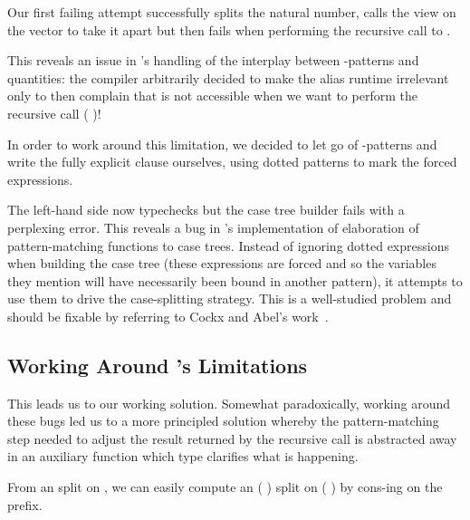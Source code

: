 Our first failing attempt successfully splits the natural number, calls the
view on the vector  to take it apart but then fails when
performing the recursive call to .


This reveals an issue in \idris{}'s handling of the interplay between
-patterns and quantities: the compiler arbitrarily decided
to make the alias  runtime irrelevant only to then complain
that  is not accessible when we want to perform the recursive
call (  )!


In order to work around this limitation, we decided to let go of
-patterns and write the fully explicit clause ourselves,
using dotted patterns to mark the forced expressions.


The left-hand side now typechecks but the case tree builder fails with a
perplexing error.
%
This reveals a bug in \idris{}'s implementation of elaboration of
pattern-matching functions to case trees.
%
Instead of ignoring dotted expressions when building the case tree (these
expressions are forced and so the variables they mention will have necessarily
been bound in another pattern), it attempts to use them to drive the case-splitting
strategy.
%
This is a well-studied problem and should be fixable by referring to
Cockx and Abel's work~\cite{DBLP:journals/jfp/CockxA20}.

\subsection{Working Around \idris{}'s Limitations}

This leads us to our working solution.
%
Somewhat paradoxically, working around these \idris{} bugs led us to a more
principled solution whereby the pattern-matching step needed to adjust the
result returned by the recursive call is abstracted away in an auxiliary
function which type clarifies what is happening.

From an  split on , we can easily compute an
( ) split on ( \IdrisFunction{::} )
by cons-ing  on the prefix.


